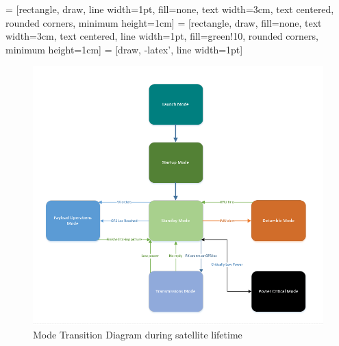 \noindent
{} = [rectangle, draw, line width=1pt, fill=none, 
text width=3cm, text centered, rounded corners, minimum height=1cm]
 = [rectangle, draw, fill=none, 
text width=3cm, text centered, line width=1pt, fill=green!10, rounded corners, minimum height=1cm]
 = [draw, -latex', line width=1pt]

\begin{figure}[H] \centering
\includegraphics[width=\textwidth]{States.png}
\caption{Mode Transition Diagram during satellite lifetime}
\end{figure}

